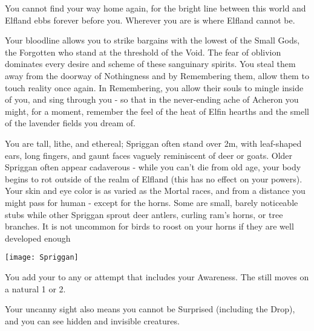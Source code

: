 {  You cannot find your way home again, for the bright line between this world and Elfland ebbs forever before you.  Wherever you are is where Elfland cannot be.

  Your bloodline allows you to strike bargains with the lowest of the Small Gods, the Forgotten who stand at the threshold of the Void.  The fear of oblivion dominates every desire and scheme of these sanguinary spirits.  You steal them away from the doorway of Nothingness and by Remembering them, allow them to touch reality once again.  In Remembering, you allow their souls to mingle inside of you, and sing through you - so that in the never-ending ache of Acheron you might, for a moment, remember the feel of the heat of Elfin hearths and the smell of the lavender fields you dream of.  

  You are tall, lithe, and ethereal; Spriggan often stand over 2m, with leaf-shaped ears, long fingers, and gaunt faces vaguely reminiscent of deer or goats.  Older Spriggan often appear cadaverous - while you can't die from old age, your body begins to rot outside of the realm of Elfland (this has no effect on your powers).  Your skin and eye color is as varied as the Mortal races, and from a distance you might pass for human - except for the horns.  Some are small, barely noticeable stubs while other Spriggan sprout deer antlers, curling ram's horns, or tree branches.  It is not uncommon for birds to roost on your horns if they are well developed enough 

    \begin{center}
      \texttt{[image: Spriggan]}
    \end{center}


  




  You add your \LVL to any \RO or \RB attempt that includes your Awareness.  The \UD still moves \DCDOWN on a natural 1 or 2.

  Your uncanny sight also means you cannot be Surprised (including the Drop), and you can see hidden and invisible creatures.

}

